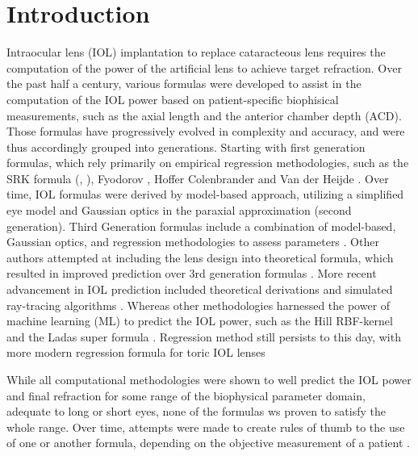 \documentclass[article,twocolumn,preprint,10pt]{paper}%
\renewcommand{\(}{\left(}
\renewcommand{\)}{\right)}
\renewcommand{\[}{\left[}
\renewcommand{\]}{\right]}
\newcommand{\1}{\mbox{\boldmath$1$}}
\begin{document}
\section{Introduction}\label{section:introduction}
Intraocular lens (IOL) implantation to replace cataracteous lens requires the computation of the power of the artificial lens to achieve target refraction. Over the past half a century, various formulas were developed to assist in the computation of the IOL power based on patient-specific biophisical measurements, such as the axial length and the anterior chamber depth (ACD). Those formulas have progressively evolved in complexity and accuracy, and were thus accordingly grouped into generations. Starting with first generation formulas, which rely primarily on empirical regression methodologies, such as the SRK formula (\cite{retzlaff1990}, \cite{sanders1980}), Fyodorov \cite{??}, Hoffer \cite{??} Colenbrander \cite{??} and Van der Heijde \cite{??}.  Over time, IOL formulas were derived by model-based approach, utilizing a simplified eye model and Gaussian optics in the paraxial approximation \cite{retzlaff1990} \cite{Haigis} \cite{Olsen} \cite{Barrett-1,Barrett-2} (second generation). Third Generation formulas include a combination of model-based, Gaussian optics, and regression methodologies to assess parameters \cite{retzlaff1990}. Other authors attempted at including the lens design into theoretical formula, which resulted in improved prediction over 3rd generation formulas \cite{naeser1997}. More recent advancement in IOL prediction included theoretical derivations and simulated ray-tracing algorithms \cite{Okulix}. Whereas other methodologies harnessed the power of machine learning (ML) to predict the IOL power, such as the Hill RBF-kernel \cite{} and the Ladas super formula \cite{ladas2015}. Regression method still persists to this day, with more modern regression formula for toric IOL lenses \cite{abulafia2016}

While all computational methodologies were shown to well predict the IOL power and final refraction for some range of the biophysical parameter domain, adequate to long or short eyes, none of the formulas ws proven to satisfy the whole range. Over time, attempts were made to create rules of thumb to the use of one or another formula, depending on the objective measurement of a patient \cite{??}. 
\end{document}
